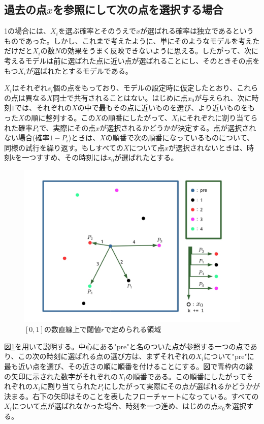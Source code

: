 \subsection{過去の点$x$を参照にして次の点を選択する場合}

1の場合には、$X_{i}$を選ぶ確率とそのうえで$x$が選ばれる確率は独立であるというものであった。しかし、これまで考えたように、単にそのようなモデルを考えただけだと$X_{i}$の数$N$の効果をうまく反映できないように思える。したがって、次に考えるモデルは前に選ばれた点に近い点が選ばれることにし、そのときその点をもつ$X_{i}$が選ばれたとするモデルである。

$X_{i}$はそれぞれ$s_{i}$個の点をもっており、モデルの設定時に仮定したとおり、これらの点は異なる$X$同士で共有されることはない。はじめに点$x_{0}$が与えられ、次に時刻$1$では、それぞれの$X$の中で最もその点に近いものを選び、より近いものをもった$X$の順に整列する。この$X$の順番にしたがって、$X_{i}$にそれぞれに割り当てられた確率$P_{i}$で、実際にその点$x$が選択されるかどうかが決定する。点が選択されない場合(確率$1-P_{i}$)ときは、$X$の順番で次の順番になっているものについて、同様の試行を繰り返す。もしすべての$X$について点$x$が選択されないときは、時刻$k$を一つすすめ、その時刻には$x_{0}$が選ばれたとする。

\begin{figure}[H]
    \begin{center}
        \includegraphics[width=12.5cm]{../img/figure2.jpg}
        \caption{$[0,1]$の数直線上で閾値$r$で定められる領域}
        \label{fig:f8}
    \end{center}
\end{figure}

図\ref{fig:f8}を用いて説明する。中心にある"pre"と名のついた点が参照する一つの点であり、この次の時刻に選ばれる点の選び方は、まずそれぞれの$X_{i}$について"pre"に最も近い点を選び、その近さの順に順番を付けることにする。図で青枠内の緑の矢印に示された数字がそれぞれの$X_{i}$の順番である。この順番にしたがってそれぞれの$X_{i}$に割り当てられた$P_{i}$にしたがって実際にその点が選ばれるかどうかが決まる。右下の矢印はそのことを表したフローチャートになっている。すべての$X_{i}$について点が選ばれなかった場合、時刻を一つ進め、はじめの点$x_{0}$を選択する。


